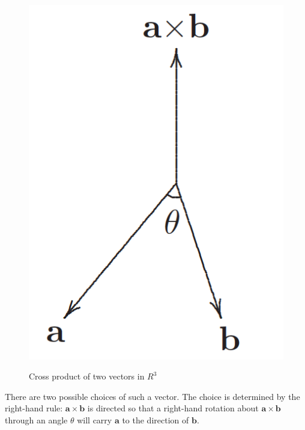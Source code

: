 \documentclass[12pt]{article}
\begin{document}
\begin{center}
  \begin{figure}[h]
    \centering
    \includegraphics[width=\linewidth/5]{figures/fig8.png}
    \label{fig:8}
    \caption{Cross product of two vectors in $R^3$}
  \end{figure}
\end{center}

There are two possible choices of such a vector. The choice is determined by the right-hand
rule: $\pmb{a}\times\pmb{b}$ is directed so that a right-hand rotation about $\pmb{a} \times \pmb{b}$ through an angle $\theta$ 
will carry $\pmb{a}$ to the direction of $\pmb{b}$.
\end{document}
